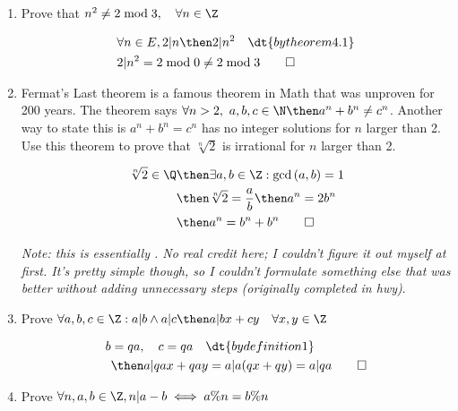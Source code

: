 \documentclass[basic, header]{nosvagor-notes}
\begin{document}
\begin{enumerate}[itemsep=8em]

  \item Prove that \(n^2 \neq 2 \bmod 3, \quad \forall n \in \Z \)


    \begin{align*}
      &\forall n \in E, 2|n  \then 2|n^2 \quad \dt{by theorem 4.1} \\
      &2|n^2 = 2 \bmod 0 \neq 2 \bmod 3 \qed
    \end{align*}

  \item Fermat’s Last theorem is a famous theorem in Math that was unproven for
    200 years. The theorem says \(\forall n > 2,~ a,b,c \in \N \then  a^n +
    b^n \neq c^n\). Another way to state this is \(a^n + b^n = c^n\) has no integer
    solutions for $n$ larger than 2. Use this theorem to prove that \(\sqrt[n]{2}\) is
    irrational for $n$ larger than 2.

    \begin{align*}
    \sqrt[n]{2} \in \Q &\then \exists a,b \in \Z : \gcd{(a,b)}=1 \\
                         &\then \sqrt[n]{2} = \frac{a}{b} \then a^n = 2b^n \\
                         &\then a^n = b^n + b^n \qed
    \end{align*}

    \textit{Note: this is essentially
      . No real
      credit here; I couldn't figure it out myself at first. It's pretty simple
      though, so I couldn't formulate something else that was better without
      adding unnecessary steps (originally completed in hwy)}.

  \newpage %

    \item Prove \(\forall a,b,c\in \Z : a|b \land a|c \then a|bx + cy \quad
      \forall x,y \in \Z\)

      \begin{align*}
        b &= qa, \quad c = qa \quad \dt{by definition 1} \\
            &\then a|qax+qay = a|a(qx+qy) = a|qa \qed
      \end{align*}

    \item Prove \(\forall  n,a,b \in \Z, n|a-b \iff a\%n = b\%n\)


\end{enumerate}
\end{document}
